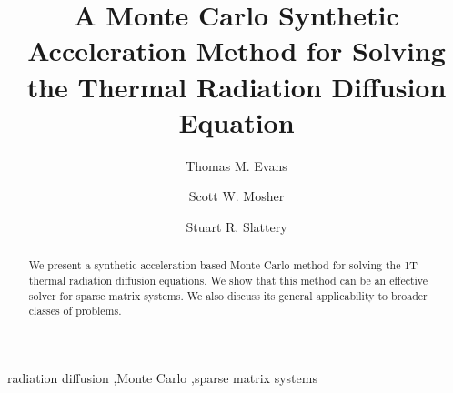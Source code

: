 \documentclass[preprint,12pt]{elsarticle}
\begin{document}
\begin{frontmatter}


  \title{A Monte Carlo Synthetic Acceleration Method for Solving the
    Thermal Radiation Diffusion Equation}
  \tnotetext[label1]{}

  \author[ornl]{Thomas M. Evans}

  \author[ornl]{Scott W. Mosher}

  \author[wisc]{Stuart R. Slattery}


  \address[ornl]{Oak Ridge National Laboratory, 
    1 Bethel Valley Rd., Oak Ridge, TN 378131 U.S.A.}
  \address[wisc]{University of Wisconsin-Madison, 1500 Engineering
    Dr., Madison, WI 53716, U.S.A.}

  \begin{abstract}

    We present a synthetic-acceleration based Monte Carlo method for
    solving the 1T thermal radiation diffusion equations.  We show
    that this method can be an effective solver for sparse matrix
    systems.  We also discuss its general applicability to broader
    classes of problems.

  \end{abstract}

  \begin{keyword}
    radiation diffusion \sep Monte Carlo \sep sparse matrix systems

  \end{keyword}

\end{frontmatter}


\end{document}
